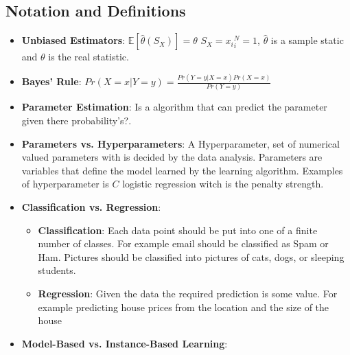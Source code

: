 \documentclass{article}
\begin{document}


\subsection{Notation and Definitions}

\begin{itemize}
    \item \textbf{Unbiased Estimators}: \newline
    $\mathbb{E}[\hat{\theta}(S_X)] = \theta$ \newline
    $S_X={x_i}^N_i=1$, $\hat{\theta}$ is a sample static and $\theta$ is the real statistic.
    \item \textbf{Bayes' Rule}: \newline
    $Pr(X=x|Y=y)=\frac{Pr(Y=y|X=x)Pr(X=x)}{Pr(Y=y)}$
    \item \textbf{Parameter Estimation}: \newline
    Is a algorithm that can predict the parameter given there probability's?. 
    \item \textbf{Parameters vs. Hyperparameters}: \newline
    A Hyperparameter, set of numerical valued parameters with is decided by the data analysis.
    Parameters are variables that define the model learned by the learning algorithm. Examples of 
    hyperparameter is $C$ logistic regression witch is the penalty strength.
    \item \textbf{Classification vs. Regression}:
    \begin{itemize}
        \item \textbf{Classification}: Each data point should be put into one of a finite number of
        classes. For example email should be classified as Spam or
        Ham. Pictures should be classified into pictures of cats,
        dogs, or sleeping students. 
        \item \textbf{Regression}: Given the data the required prediction is some value. For
        example predicting house prices from the location and the
        size of the house
    \end{itemize}
    \item \textbf{Model-Based vs. Instance-Based Learning}: \newline

\end{itemize}
\end{document}
